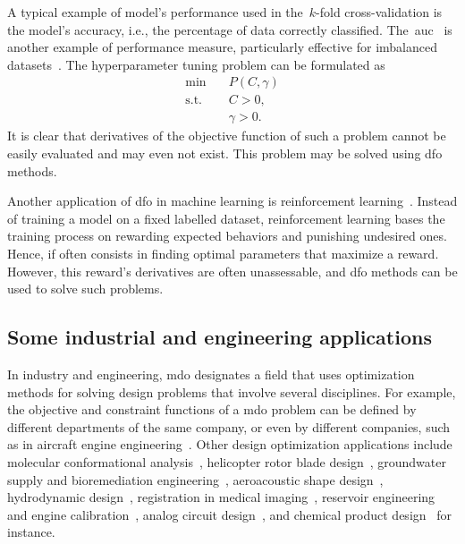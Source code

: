 A typical example of model's performance used in the~$k$-fold cross-validation is the model's accuracy, i.e., the percentage of data correctly classified.
The~\gls{auc}~\cite{Hanley_Mcneil_1982} is another example of performance measure, particularly effective for imbalanced datasets~\cite{Bradley_1997}.
The hyperparameter tuning problem can be formulated as
\begin{equation*}
    \begin{aligned}
        \min        & \quad P(C, \gamma)\\
        \text{s.t.} & \quad C > 0,\\
                    & \quad \gamma > 0.
    \end{aligned}
\end{equation*}
It is clear that derivatives of the objective function of such a problem cannot be easily evaluated and may even not exist.
This problem may be solved using \gls{dfo} methods.

Another application of \gls{dfo} in machine learning is reinforcement learning~\cite{Qian_Yu_2021}.
Instead of training a model on a fixed labelled dataset, reinforcement learning bases the training process on rewarding expected behaviors and punishing undesired ones.
Hence, if often consists in finding optimal parameters that maximize a reward.
However, this reward's derivatives are often unassessable, and \gls{dfo} methods can be used to solve such problems.

\subsection{Some industrial and engineering applications}

In industry and engineering, \gls{mdo} designates a field that uses optimization methods for solving design problems that involve several disciplines.
For example, the objective and constraint functions of a \gls{mdo} problem can be defined by different departments of the same company, or even by different companies, such as in aircraft engine engineering~\cite{Gazaix_Etal_2019}.
Other design optimization applications include molecular conformational analysis~\cite{Alberto_Etal_2004,Meza_Martinez_1994}, helicopter rotor blade design~\cite{Booker_Etal_1998a,Booker_Etal_1998b,Serafini_1998}, groundwater supply and bioremediation engineering~\cite{Fowler_Etal_2008,Mugunthan_Shoemaker_Regis_2005,Yoon_Shoemaker_1999}, aeroacoustic shape design~\cite{Marsden_2004,Marsden_Etal_2004}, hydrodynamic design~\cite{Duvigneau_Visonneau_2004}, registration in medical imaging~\cite{Oeuvray_2005,Oeuvray_Bierlaire_2007}, reservoir engineering and engine calibration~\cite{Langouet_2011}, analog circuit design~\cite{Latorre_Etal_2019}, and chemical product design~\cite{Sun_Etal_2020} for instance.

